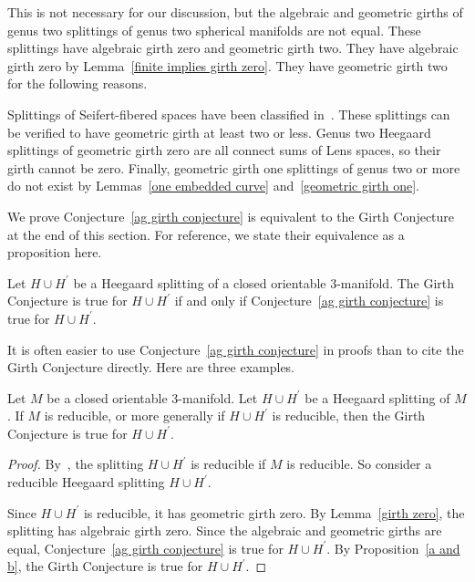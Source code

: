 This is not necessary for our discussion, but the algebraic and geometric girths of genus two splittings of genus two spherical manifolds are not equal.  These splittings have algebraic girth zero and geometric girth two.  They have algebraic girth zero by Lemma~\ref{finite implies girth zero}.  They have geometric girth two for the following reasons.

Splittings of Seifert-fibered spaces have been classified in~\cite{MS}.  These splittings can be verified to have geometric girth at least two or less.  Genus two Heegaard splittings of geometric girth zero are all connect sums of Lens spaces, so their girth cannot be zero.  Finally, geometric girth one splittings of genus two or more do not exist by Lemmas~\ref{one embedded curve} and~\ref{geometric girth one}.

We prove Conjecture~\ref{ag girth conjecture} is equivalent to the Girth Conjecture at the end of this section.  For reference, we state their equivalence as a proposition here.

\begin{proposition}
\label{a and b}
Let $H\cup H^{\prime}$ be a Heegaard splitting of a closed orientable 3-manifold.  The Girth Conjecture is true for $H\cup H^{\prime}$ if and only if Conjecture~\ref{ag girth conjecture} is true for $H\cup H^{\prime}$.
\end{proposition}

It is often easier to use Conjecture~\ref{ag girth conjecture} in proofs than to cite the Girth Conjecture directly.  Here are three examples.

\begin{lemma}
\label{reducible}
Let $M$ be a closed orientable 3-manifold.  Let $H\cup H^\prime$ be a Heegaard splitting of $M$.  If $M$ is reducible, or more generally if $H\cup H^{\prime}$ is reducible, then the Girth Conjecture is true for $H\cup H^{\prime}$.
\end{lemma}

\begin{proof}
By~\cite{Ha}, the splitting $H\cup H^{\prime}$ is reducible if $M$ is reducible.  So consider a reducible Heegaard splitting $H\cup H^{\prime}$.

Since $H\cup H^{\prime}$ is reducible, it has geometric girth zero.  By Lemma~\ref{girth zero}, the splitting has algebraic girth zero.  Since the algebraic and geometric girths are equal, Conjecture~\ref{ag girth conjecture} is true for $H\cup H^{\prime}$.  By Proposition~\ref{a and b}, the Girth Conjecture is true for $H\cup H^{\prime}$.
\end{proof}

